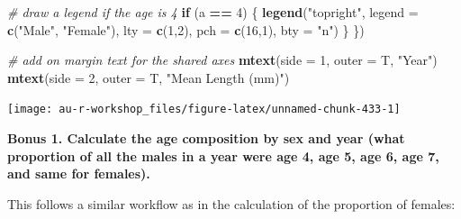 \documentclass[]{book}
\newenvironment{Shaded}{\begin{snugshade}}{\end{snugshade}}
\newcommand{\KeywordTok}[1]{\textcolor[rgb]{0.13,0.29,0.53}{\textbf{#1}}}
\newcommand{\DataTypeTok}[1]{\textcolor[rgb]{0.13,0.29,0.53}{#1}}
\newcommand{\DecValTok}[1]{\textcolor[rgb]{0.00,0.00,0.81}{#1}}
\newcommand{\StringTok}[1]{\textcolor[rgb]{0.31,0.60,0.02}{#1}}
\newcommand{\CommentTok}[1]{\textcolor[rgb]{0.56,0.35,0.01}{\textit{#1}}}
\newcommand{\ControlFlowTok}[1]{\textcolor[rgb]{0.13,0.29,0.53}{\textbf{#1}}}
\newcommand{\OperatorTok}[1]{\textcolor[rgb]{0.81,0.36,0.00}{\textbf{#1}}}
\newcommand{\NormalTok}[1]{#1}
\theoremstyle{definition}
\theoremstyle{definition}
\theoremstyle{definition}
\theoremstyle{remark}
\begin{document}
\begin{Shaded}
\begin{Highlighting}[]
  \CommentTok{# draw a legend if the age is 4}
  \ControlFlowTok{if}\NormalTok{ (a }\OperatorTok{==}\StringTok{ }\DecValTok{4}\NormalTok{) \{}
    \KeywordTok{legend}\NormalTok{(}\StringTok{"topright"}\NormalTok{, }\DataTypeTok{legend =} \KeywordTok{c}\NormalTok{(}\StringTok{"Male"}\NormalTok{, }\StringTok{"Female"}\NormalTok{),}
           \DataTypeTok{lty =} \KeywordTok{c}\NormalTok{(}\DecValTok{1}\NormalTok{,}\DecValTok{2}\NormalTok{), }\DataTypeTok{pch =} \KeywordTok{c}\NormalTok{(}\DecValTok{16}\NormalTok{,}\DecValTok{1}\NormalTok{), }\DataTypeTok{bty =} \StringTok{"n"}\NormalTok{)}
\NormalTok{  \}}
\NormalTok{\})}

\CommentTok{# add on margin text for the shared axes}
\KeywordTok{mtext}\NormalTok{(}\DataTypeTok{side =} \DecValTok{1}\NormalTok{, }\DataTypeTok{outer =}\NormalTok{ T, }\StringTok{"Year"}\NormalTok{)}
\KeywordTok{mtext}\NormalTok{(}\DataTypeTok{side =} \DecValTok{2}\NormalTok{, }\DataTypeTok{outer =}\NormalTok{ T, }\StringTok{"Mean Length (mm)"}\NormalTok{)}
\end{Highlighting}
\end{Shaded}

\begin{center}\texttt{[image: au-r-workshop\_files/figure-latex/unnamed-chunk-433-1]} \end{center}

\textbf{Bonus 1. Calculate the age composition by sex and year (what
proportion of all the males in a year were age 4, age 5, age 6, age 7,
and same for females).}

This follows a similar workflow as in the calculation of the proportion
of females:

\begin{Shaded}
\end{Shaded}
\end{document}
